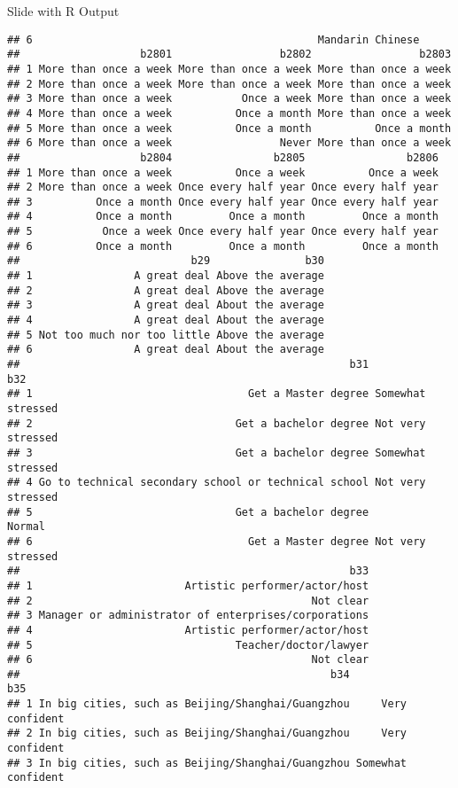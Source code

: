\documentclass[
  ignorenonframetext,
]{beamer}
\begin{document}
\begin{frame}[fragile]{Slide with R Output}
\begin{verbatim}
## 6                                             Mandarin Chinese
##                   b2801                 b2802                 b2803
## 1 More than once a week More than once a week More than once a week
## 2 More than once a week More than once a week More than once a week
## 3 More than once a week           Once a week More than once a week
## 4 More than once a week          Once a month More than once a week
## 5 More than once a week          Once a month          Once a month
## 6 More than once a week                 Never More than once a week
##                   b2804                b2805                b2806
## 1 More than once a week          Once a week          Once a week
## 2 More than once a week Once every half year Once every half year
## 3          Once a month Once every half year Once every half year
## 4          Once a month         Once a month         Once a month
## 5           Once a week Once every half year Once every half year
## 6          Once a month         Once a month         Once a month
##                           b29               b30
## 1                A great deal Above the average
## 2                A great deal Above the average
## 3                A great deal About the average
## 4                A great deal About the average
## 5 Not too much nor too little Above the average
## 6                A great deal About the average
##                                                    b31               b32
## 1                                  Get a Master degree Somewhat stressed
## 2                                Get a bachelor degree Not very stressed
## 3                                Get a bachelor degree Somewhat stressed
## 4 Go to technical secondary school or technical school Not very stressed
## 5                                Get a bachelor degree            Normal
## 6                                  Get a Master degree Not very stressed
##                                                    b33
## 1                        Artistic performer/actor/host
## 2                                            Not clear
## 3 Manager or administrator of enterprises/corporations
## 4                        Artistic performer/actor/host
## 5                                Teacher/doctor/lawyer
## 6                                            Not clear
##                                                 b34                b35
## 1 In big cities, such as Beijing/Shanghai/Guangzhou     Very confident
## 2 In big cities, such as Beijing/Shanghai/Guangzhou     Very confident
## 3 In big cities, such as Beijing/Shanghai/Guangzhou Somewhat confident

\end{verbatim}
\end{frame}
\end{document}
